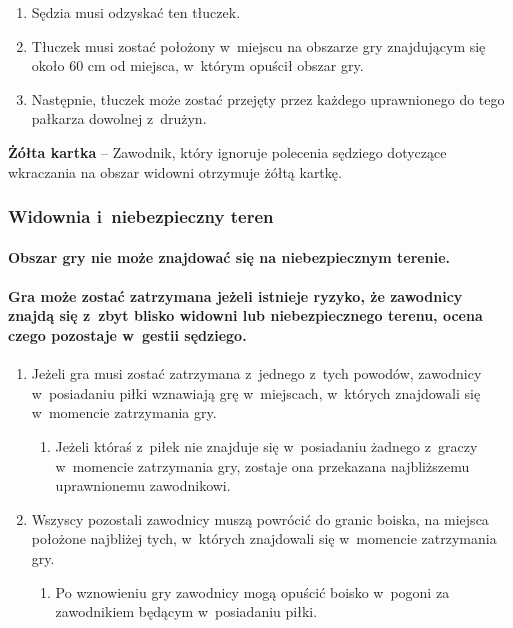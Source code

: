 \documentclass[12pt,a4paper]{article}
\newcommand\yellowcard[1]{\bgroup\textcolor{darkyellow}{\textbf{#1}}}
\begin{document}
\begin{enumerate}
\begin{enumerate}
		            \begin{enumerate}
			            \item
			                  Sędzia musi odzyskać ten tłuczek.
			            \item
			                  Tłuczek musi zostać położony w~miejscu na obszarze gry znajdującym
			                  się około 60 cm od miejsca, w~którym opuścił obszar gry.
			            \item
			                  Następnie, tłuczek może zostać przejęty przez każdego uprawnionego
			                  do tego pałkarza dowolnej z~drużyn.
		            \end{enumerate}
	      \end{enumerate}
\end{enumerate}

\yellowcard{Żółta kartka} -- Zawodnik, który ignoruje polecenia sędziego
dotyczące wkraczania na obszar widowni otrzymuje żółtą kartkę.

\subsubsection{Widownia i~niebezpieczny teren}

\paragraph{Obszar gry nie może znajdować się na niebezpiecznym terenie.}

\paragraph{Gra może zostać zatrzymana jeżeli istnieje ryzyko, że
	zawodnicy znajdą się z~zbyt blisko widowni lub niebezpiecznego terenu,
	ocena czego pozostaje w~gestii sędziego.}

\begin{enumerate}
	\item
	      Jeżeli gra musi zostać zatrzymana z~jednego z~tych powodów, zawodnicy
	      w~posiadaniu piłki wznawiają grę w~miejscach, w~których znajdowali się
	      w~momencie zatrzymania gry.

	      \begin{enumerate}
		      \item
		            Jeżeli któraś z~piłek nie znajduje się w~posiadaniu żadnego z~graczy
		            w~momencie zatrzymania gry, zostaje ona przekazana najbliższemu
		            uprawnionemu zawodnikowi.
	      \end{enumerate}
	\item
	      Wszyscy pozostali zawodnicy muszą powrócić do granic boiska, na
	      miejsca położone najbliżej tych, w~których znajdowali się w~momencie
	      zatrzymania gry.

	      \begin{enumerate}
		      \item
		            Po wznowieniu gry zawodnicy mogą opuścić boisko w~pogoni za
		            zawodnikiem będącym w~posiadaniu piłki.
	      \end{enumerate}
\end{enumerate}
\end{document}
